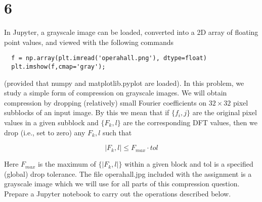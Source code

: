 \documentclass[11pt]{article}
\begin{document}
\newpage

\section{6}

In Jupyter, a grayscale image can be loaded, converted into a 2D array of floating point
values, and viewed with the following commands

\begin{verbatim}
  f = np.array(plt.imread('operahall.png'), dtype=float)
  plt.imshow(f,cmap='gray');
\end{verbatim}

(provided that numpy and matplotlib.pyplot are loaded).
In this problem, we study a simple form of compression on grayscale images. We will obtain compression by dropping (relatively) small Fourier coefficients on $32 \times 32$ pixel subblocks of an input image. By this we mean that if $\{f_i,j\}$ are the original pixel values in a given subblock and $\{F_k,l\}$ are the corresponding DFT values, then we drop (i.e., set to zero) any $F_k,l$ such that

\[ |F_k, l| \leq F_{max} \cdot tol \]

Here $F_{max}$ is the maximum of $\{|F_k,l|\}$ within a given block and tol is a specified (global) drop tolerance. The file operahall.jpg included with the assignment is a grayscale image which we will use for all parts of this compression question. Prepare a Jupyter notebook to carry out the operations described below.
\end{document}
